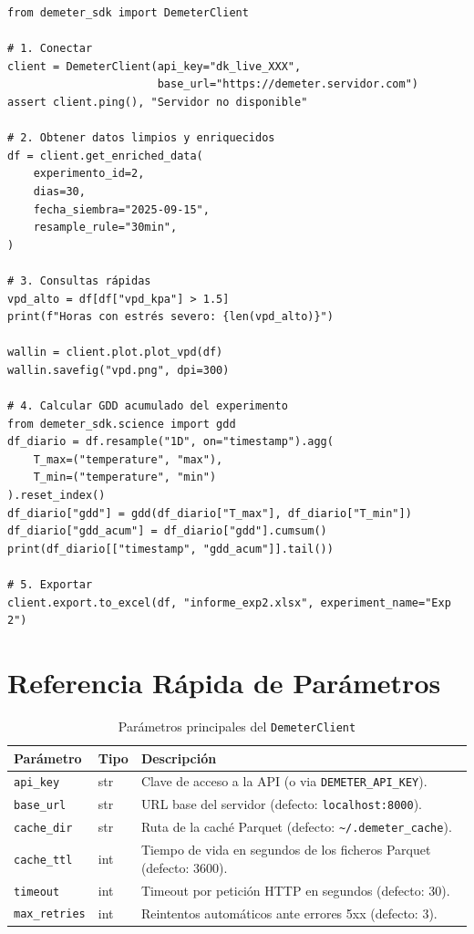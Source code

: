 \begin{lstlisting}[style=trama, caption={Sesión completa en Jupyter Notebook}]
from demeter_sdk import DemeterClient

# 1. Conectar
client = DemeterClient(api_key="dk_live_XXX",
                       base_url="https://demeter.servidor.com")
assert client.ping(), "Servidor no disponible"

# 2. Obtener datos limpios y enriquecidos
df = client.get_enriched_data(
    experimento_id=2,
    dias=30,
    fecha_siembra="2025-09-15",
    resample_rule="30min",
)

# 3. Consultas rápidas
vpd_alto = df[df["vpd_kpa"] > 1.5]
print(f"Horas con estrés severo: {len(vpd_alto)}")

wallin = client.plot.plot_vpd(df)
wallin.savefig("vpd.png", dpi=300)

# 4. Calcular GDD acumulado del experimento
from demeter_sdk.science import gdd
df_diario = df.resample("1D", on="timestamp").agg(
    T_max=("temperature", "max"),
    T_min=("temperature", "min")
).reset_index()
df_diario["gdd"] = gdd(df_diario["T_max"], df_diario["T_min"])
df_diario["gdd_acum"] = df_diario["gdd"].cumsum()
print(df_diario[["timestamp", "gdd_acum"]].tail())

# 5. Exportar
client.export.to_excel(df, "informe_exp2.xlsx", experiment_name="Exp 2")
\end{lstlisting}

\section{Referencia Rápida de Parámetros}

\begin{table}[H]
    \centering
    \caption{Parámetros principales del \texttt{DemeterClient}}
    \begin{tabularx}{\textwidth}{llX}
        \toprule
        \textbf{Parámetro}  & \textbf{Tipo}  & \textbf{Descripción} \\
        \midrule
        \texttt{api\_key}       & str    & Clave de acceso a la API (o via \texttt{DEMETER\_API\_KEY}). \\
        \texttt{base\_url}      & str    & URL base del servidor (defecto: \texttt{localhost:8000}). \\
        \texttt{cache\_dir}     & str    & Ruta de la caché Parquet (defecto: \texttt{\~{}/.demeter\_cache}). \\
        \texttt{cache\_ttl}     & int    & Tiempo de vida en segundos de los ficheros Parquet (defecto: 3600). \\
        \texttt{timeout}        & int    & Timeout por petición HTTP en segundos (defecto: 30). \\
        \texttt{max\_retries}   & int    & Reintentos automáticos ante errores 5xx (defecto: 3). \\
        \bottomrule
    \end{tabularx}
\end{table}
